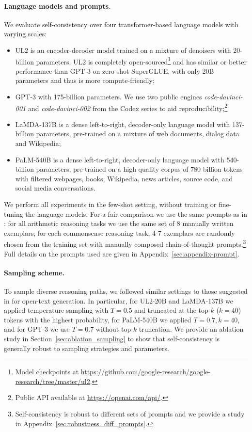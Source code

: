 \paragraph{Language models and prompts.} We evaluate self-consistency over four transformer-based language models with varying scales:

\begin{itemize}[leftmargin=0.6cm]

    \item UL2 \citep{ul2} is an encoder-decoder model trained on a mixture of denoisers with 20-billion parameters. UL2 is completely open-sourced\footnote{Model checkpoints at \scriptsize{\url{https://github.com/google-research/google-research/tree/master/ul2}}.} and has similar or better performance than GPT-3 on zero-shot SuperGLUE, with only 20B parameters and thus is more compute-friendly;
    \item GPT-3 \citep{brown2020language} with 175-billion parameters. We use two public engines \textit{code-davinci-001} and \textit{code-davinci-002} from the Codex series \citep{chen2021evaluating} to aid reproducibility;\footnote{Public API available at \scriptsize{\url{https://openai.com/api/}.}}
    \item LaMDA-137B \citep{thoppilan2022lamda} is a dense left-to-right, decoder-only language model with 137-billion parameters, pre-trained on a mixture of web documents, dialog data and Wikipedia; 
\item PaLM-540B \citep{palm} is a dense left-to-right, decoder-only language model with 540-billion parameters, pre-trained on a high quality corpus of 780 billion tokens with filtered webpages, books, Wikipedia, news articles, source code, and social media conversations.
\end{itemize}

We perform all experiments in the few-shot setting, without training or fine-tuning the language models. For a fair comparison we use the same prompts as in \citet{wei2022chain}: for all arithmetic reasoning tasks we use the same set of 8 manually written exemplars; for each commonsense reasoning task, 4-7 exemplars are randomly chosen from the training set with manually composed chain-of-thought prompts.\footnote{Self-consistency is robust to different sets of prompts and we provide a study in Appendix~\ref{sec:robustness_diff_prompts}.}
Full details on the prompts used are given in Appendix~\ref{sec:appendix-prompt}.

\paragraph{Sampling scheme.} To sample diverse reasoning paths, we followed similar settings to those suggested in \citet{Radford2019LanguageMA,nucleus_sampling} for open-text generation. In particular, for UL2-20B and LaMDA-137B we applied temperature sampling with $T=0.5$ and truncated at the top-$k$ ($k=40$) tokens with the highest probability, for PaLM-540B  we applied $T=0.7, k=40$, and for GPT-3 we use $T=0.7$ without top-$k$ truncation. We provide an ablation study in Section~\ref{sec:ablation_sampling} to show that self-consistency is generally robust to sampling strategies and parameters.

